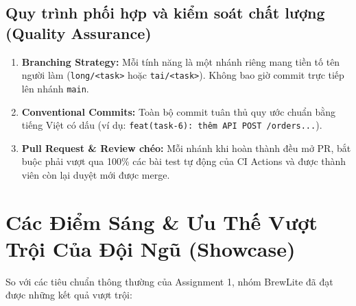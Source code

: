 \documentclass[12pt, a4paper]{article}
\begin{document}
\subsection{Quy trình phối hợp và kiểm soát chất lượng (Quality Assurance)}
\begin{enumerate}[itemsep=4pt]
  \item \textbf{Branching Strategy:} Mỗi tính năng là một nhánh riêng mang tiền tố tên người làm (\texttt{long/<task>} hoặc \texttt{tai/<task>}). Không bao giờ commit trực tiếp lên nhánh \texttt{main}.
  \item \textbf{Conventional Commits:} Toàn bộ commit tuân thủ quy ước chuẩn bằng tiếng Việt có dấu (ví dụ: \texttt{feat(task-6): thêm API POST /orders...}).
  \item \textbf{Pull Request \& Review chéo:} Mỗi nhánh khi hoàn thành đều mở PR, bắt buộc phải vượt qua 100\% các bài test tự động của CI Actions và được thành viên còn lại duyệt mới được merge.
\end{enumerate}

\clearpage
\section{Các Điểm Sáng \& Ưu Thế Vượt Trội Của Đội Ngũ (Showcase)}

So với các tiêu chuẩn thông thường của Assignment 1, nhóm BrewLite đã đạt được những kết quả vượt trội:
\end{document}
